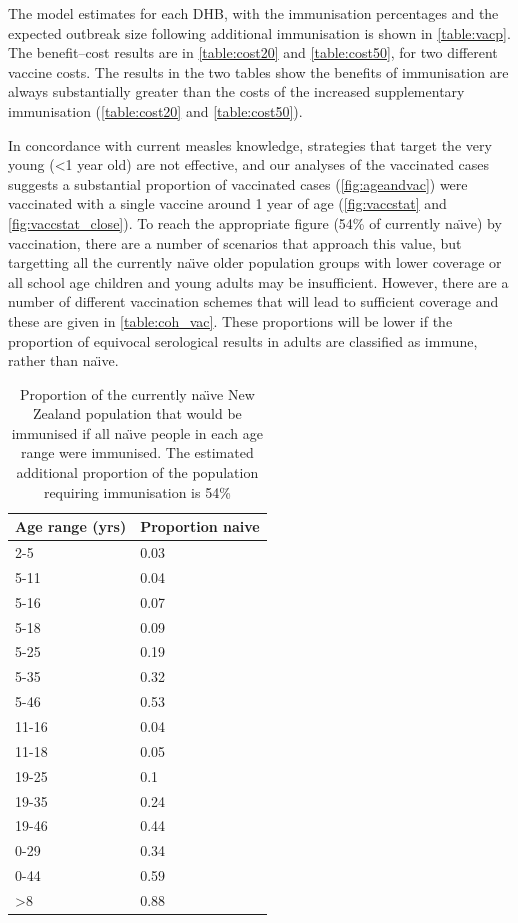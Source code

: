 \documentclass{article}
\begin{document}
The model estimates for each DHB, with the immunisation percentages and the expected outbreak size following additional immunisation is shown in \autoref{table:vacp}. The benefit--cost results are in \autoref{table:cost20} and \autoref{table:cost50}, for two different vaccine costs. The results in the two tables show the benefits of immunisation are always substantially greater than the costs of the increased supplementary immunisation (\autoref{table:cost20} and \autoref{table:cost50}).

In concordance with current measles knowledge, strategies that target the very young (<1 year old) are not effective, and our analyses of the vaccinated cases suggests a substantial proportion of vaccinated cases (\autoref{fig:ageandvac}) were vaccinated with a single vaccine around 1 year of age (\autoref{fig:vaccstat} and \autoref{fig:vaccstat_close}). To reach the appropriate figure (54\% of currently na\"{\i}ve) by vaccination, there are a number of scenarios that approach this value, but targetting all the currently na\"{\i}ve older population groups with lower coverage or all school age children and young adults may be insufficient. However, there are a number of different vaccination schemes that will lead to sufficient coverage and these are given in \autoref{table:coh_vac}. These proportions will be lower if the proportion of equivocal serological results in adults are classified as immune, rather than na\"{\i}ve.

\begin{table}[hbtp] \scriptsize
\captionsetup{width=1\textwidth}
\begin{center}
\begin{tabular}{ll}
\hline\hline
\multicolumn{1}{c}{Age range (yrs)}&\multicolumn{1}{c}{Proportion naive}\tabularnewline
\hline
2-5&0.03\tabularnewline
5-11&0.04\tabularnewline
5-16&0.07\tabularnewline
5-18&0.09\tabularnewline
5-25&0.19\tabularnewline
5-35&0.32\tabularnewline
5-46&0.53\tabularnewline
11-16&0.04\tabularnewline
11-18&0.05\tabularnewline
19-25&0.1\tabularnewline
19-35&0.24\tabularnewline
19-46&0.44\tabularnewline
0-29&0.34\tabularnewline
0-44&0.59\tabularnewline
\textgreater8&0.88\tabularnewline
\hline
\end{tabular}\end{center}\caption{Proportion of the currently na\"{\i}ve New Zealand population that would be immunised if all na\"{\i}ve people in each age range were immunised. The estimated additional proportion of the population requiring immunisation is 54\%}
\label{table:coh_vac}
\end{table}
\end{document}
